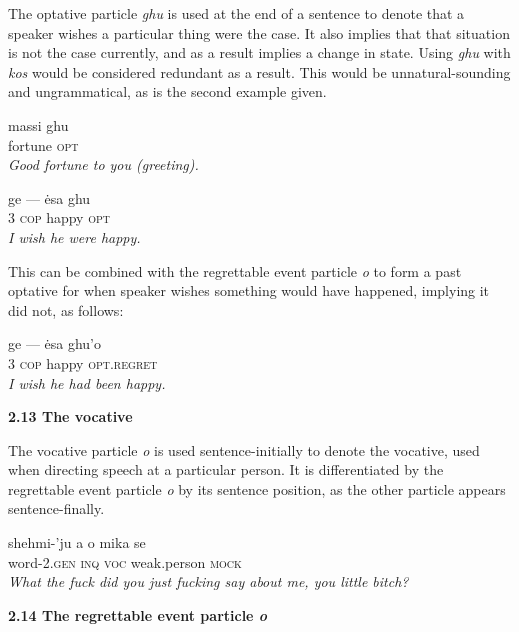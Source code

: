\documentclass{article}[10pt]
\begin{document}
The optative particle \emph{ghu} is used at the end of a sentence to denote that a speaker wishes a particular thing were the case. It also implies that that situation is not the case currently, and as a result implies a change in state. Using \emph{ghu} with \emph{kos} would be considered redundant as a result. This would be unnatural-sounding and ungrammatical, as is the second example given.
\begin{exe}
\ex
\gll massi ghu\\
fortune \textsc{opt}\\
\trans \emph{Good fortune to you (greeting).}


\ex
\gll ge --- \.{e}sa ghu\\
3 \textsc{cop} happy \textsc{opt}\\
\trans \emph{I wish he were happy.}
\end{exe}

This can be combined with the regrettable event particle \emph{o} to form a past optative for when speaker wishes something would have happened, implying it did not, as follows:
\begin{exe}
\ex
\gll ge --- \.{e}sa ghu'o\\
3 \textsc{cop} happy \textsc{opt.regret}\\
\trans \emph{I wish he had been happy.}
\end{exe}

{\bf 2.13 The vocative}

The vocative particle \emph{o} is used sentence-initially to denote the vocative, used when directing speech at a particular person. It is differentiated by the regrettable event particle \emph{o} by its sentence position, as the other particle appears sentence-finally.
\begin{exe}
\ex
\gll shehmi-'ju a o mika se\\
word-2.\textsc{gen} \textsc{inq} \textsc{voc} weak.person \textsc{mock}\\
\trans \emph{What the fuck did you just fucking say about me, you little bitch?}
\end{exe}

{\bf 2.14 The regrettable event particle \emph{o}}
\end{document}
